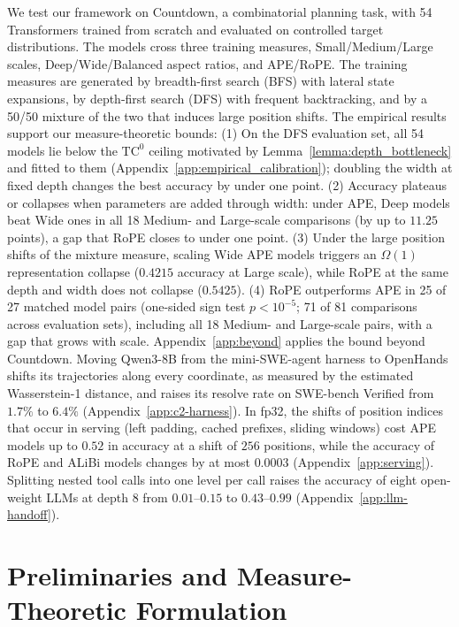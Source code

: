 \documentclass{article}
\begin{document}
We test our framework on Countdown, a combinatorial planning task, with 54 Transformers trained from scratch and evaluated on controlled target distributions. The models cross three training measures, Small/Medium/Large scales, Deep/Wide/Balanced aspect ratios, and APE/RoPE. The training measures are generated by breadth-first search (BFS) with lateral state expansions, by depth-first search (DFS) with frequent backtracking, and by a 50/50 mixture of the two that induces large position shifts. The empirical results support our measure-theoretic bounds: 
(1) On the DFS evaluation set, all 54 models lie below the $\text{TC}^0$ ceiling motivated by Lemma~\ref{lemma:depth_bottleneck} and fitted to them (Appendix~\ref{app:empirical_calibration}); doubling the width at fixed depth changes the best accuracy by under one point. 
(2) Accuracy plateaus or collapses when parameters are added through width: under APE, Deep models beat Wide ones in all 18 Medium- and Large-scale comparisons (by up to $11.25$ points), a gap that RoPE closes to under one point. 
(3) Under the large position shifts of the mixture measure, scaling Wide APE models triggers an $\Omega(1)$ representation collapse ($0.4215$ accuracy at Large scale), while RoPE at the same depth and width does not collapse ($0.5425$). 
(4) RoPE outperforms APE in 25 of 27 matched model pairs (one-sided sign test $p<10^{-5}$; 71 of 81 comparisons across evaluation sets), including all 18 Medium- and Large-scale pairs, with a gap that grows with scale. 
Appendix~\ref{app:beyond} applies the bound beyond Countdown. Moving Qwen3-8B from the mini-SWE-agent harness to OpenHands shifts its trajectories along every coordinate, as measured by the estimated Wasserstein-1 distance, and raises its resolve rate on SWE-bench Verified from $1.7\%$ to $6.4\%$ (Appendix~\ref{app:c2-harness}). In fp32, the shifts of position indices that occur in serving (left padding, cached prefixes, sliding windows) cost APE models up to $0.52$ in accuracy at a shift of $256$ positions, while the accuracy of RoPE and ALiBi models changes by at most $0.0003$ (Appendix~\ref{app:serving}). Splitting nested tool calls into one level per call raises the accuracy of eight open-weight LLMs at depth $8$ from $0.01$--$0.15$ to $0.43$--$0.99$ (Appendix~\ref{app:llm-handoff}).

\section{Preliminaries and Measure-Theoretic Formulation}
\label{sec:preliminaries}
\end{document}
